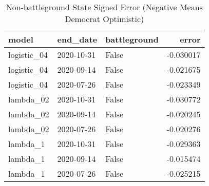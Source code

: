 \begin{table}
\centering
\caption{Non-battleground State Signed Error
(Negative Means Democrat Optimistic)}
\label{table:signed\_error\_non\_battleground\_time\_series}
\begin{tabular}{lllr}
\toprule
       model &    end\_date &  battleground &     error \\
\midrule
 logistic\_04 &  2020-10-31 &         False & -0.030017 \\
 logistic\_04 &  2020-09-14 &         False & -0.021675 \\
 logistic\_04 &  2020-07-26 &         False & -0.023349 \\
   lambda\_02 &  2020-10-31 &         False & -0.030772 \\
   lambda\_02 &  2020-09-14 &         False & -0.020245 \\
   lambda\_02 &  2020-07-26 &         False & -0.020276 \\
    lambda\_1 &  2020-10-31 &         False & -0.029363 \\
    lambda\_1 &  2020-09-14 &         False & -0.015474 \\
    lambda\_1 &  2020-07-26 &         False & -0.025215 \\
\bottomrule
\end{tabular}
\end{table}
